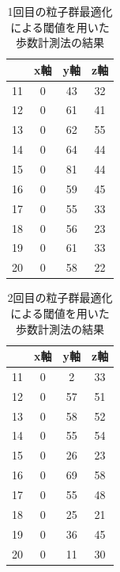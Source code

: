 \begin{table}[htb]
  \begin{center}
    \caption{1回目の粒子群最適化による閾値を用いた歩数計測法の結果}
    \label{data2}
    \begin{tabular}{|c|c|c|c|} \hline
      & x軸 & y軸 & z軸  \\ \hline \hline
      11 & 0 & 43 & 32  \\ \hline
      12 & 0 & 61 & 41 \\ \hline
      13 & 0 & 62 & 55 \\ \hline
      14 & 0 & 64 & 44 \\ \hline
      15 & 0 & 81 & 44 \\ \hline
      16 & 0 & 59 & 45 \\ \hline
      17 & 0 & 55 & 33 \\ \hline
      18 & 0 & 56 & 23 \\ \hline
      19 & 0 & 61 & 33 \\ \hline
      20 & 0 & 58 & 22 \\ \hline
    \end{tabular}
  \end{center}
\end{table}

\begin{table}[htb]
  \begin{center}
    \caption{2回目の粒子群最適化による閾値を用いた歩数計測法の結果}
    \label{data3}
    \begin{tabular}{|c|c|c|c|} \hline
      & x軸 & y軸 & z軸  \\ \hline \hline
      11 & 0 &	 2 &	33  \\ \hline
      12 & 0 &	57 &	51  \\ \hline
      13 & 0 &	58 &	52  \\ \hline
      14 & 0 &	55 &	54  \\ \hline
      15 & 0 &	26 &	23  \\ \hline
      16 & 0 &	69 &	58  \\ \hline
      17 & 0 &	55 &	48  \\ \hline
      18 & 0 &	25 &	21  \\ \hline
      19 & 0 &	36 &	45  \\ \hline
      20 & 0 &	11 &	30    \\ \hline
    \end{tabular}
  \end{center}
\end{table}

